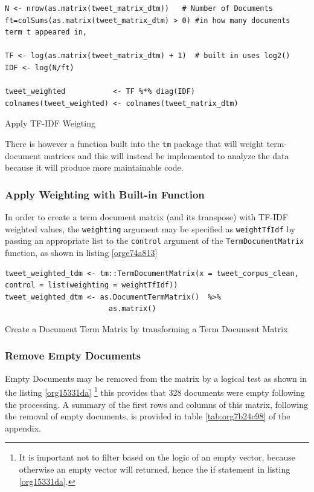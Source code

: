 \documentclass[11pt]{article}
\begin{document}
\begin{enumerate}
\begin{listing}[htbp]
\begin{verbatim}
N <- nrow(as.matrix(tweet_matrix_dtm))   # Number of Documents
ft=colSums(as.matrix(tweet_matrix_dtm) > 0) #in how many documents term t appeared in,

TF <- log(as.matrix(tweet_matrix_dtm) + 1)  # built in uses log2()
IDF <- log(N/ft)

tweet_weighted           <- TF %*% diag(IDF)
colnames(tweet_weighted) <- colnames(tweet_matrix_dtm)
\end{verbatim}
\caption{\label{org70f79b8}Apply TF-IDF Weigting}
\end{listing}

There is however a function built into the \texttt{tm} package that will weight term-document matrices and this will instead be implemented to analyze the data because it will produce more maintainable code.
\end{enumerate}

\subsubsection{Apply Weighting with Built-in Function}
\label{sec:orgfe9eeb9}
In order to create a term document matrix (and its transpose) with TF-IDF weighted values, the \texttt{weighting} argument may be specified as \texttt{weightTfIdf} by passing an appropriate list to the \texttt{control} argument of the \texttt{TermDocumentMatrix} function, as shown in listing \ref{orge74a813}

\begin{listing}[htbp]
\begin{verbatim}
tweet_weighted_tdm <- tm::TermDocumentMatrix(x = tweet_corpus_clean, control = list(weighting = weightTfIdf))
tweet_weighted_dtm <- as.DocumentTermMatrix()  %>%
                        as.matrix()
\end{verbatim}
\caption{\label{orge74a813}Create a Document Term Matrix by transforming a Term Document Matrix}
\end{listing}

\subsubsection{Remove Empty Documents}
\label{sec:org628294f}
Empty Documents may be removed from the matrix by a logical test as shown in the listing  \ref{org15331da} \footnote{It is important not to filter based on the logic of an empty vector, because
otherwise an empty vector will returned, hence the if statement in listing \ref{org15331da}.} this provides that 328 documents were empty following the processing. A summary of the first rows and columns of this matrix, following the removal of empty documents, is provided in table \ref{tab:org7b24c98} of the appendix.
\end{document}
